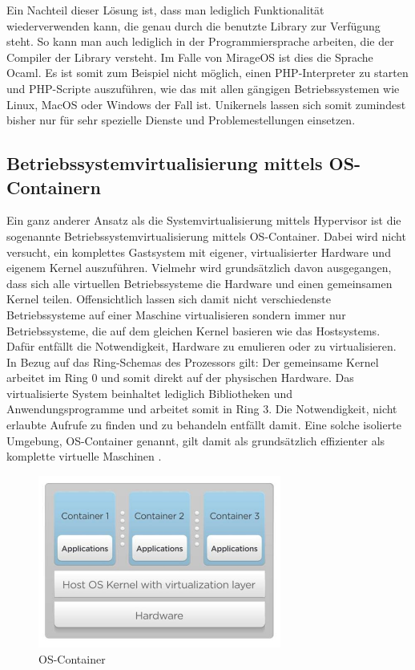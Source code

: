 Ein Nachteil dieser Lösung ist, dass man lediglich Funktionalität wiederverwenden kann, die genau durch die benutzte Library zur Verfügung steht. So kann man auch lediglich in der Programmiersprache arbeiten, die der Compiler der Library versteht. Im Falle von MirageOS ist dies die Sprache Ocaml. Es ist somit zum Beispiel nicht möglich, einen PHP-Interpreter zu starten und PHP-Scripte auszuführen, wie das mit allen gängigen Betriebssystemen wie Linux, MacOS oder Windows der Fall ist. Unikernels lassen sich somit zumindest bisher nur für sehr spezielle Dienste und Problemestellungen einsetzen.

\subsection{Betriebssystemvirtualisierung mittels OS-Containern}

Ein ganz anderer Ansatz als die Systemvirtualisierung mittels Hypervisor ist die sogenannte Betriebssystemvirtualisierung mittels OS-Container. Dabei wird nicht versucht, ein komplettes Gastsystem mit eigener, virtualisierter Hardware und eigenem Kernel auszuführen. Vielmehr wird grundsätzlich davon ausgegangen, dass sich alle virtuellen Betriebssysteme die Hardware und einen gemeinsamen Kernel teilen. Offensichtlich lassen sich damit nicht verschiedenste Betriebssysteme auf einer Maschine virtualisieren sondern immer nur Betriebssysteme, die auf dem gleichen Kernel basieren wie das Hostsystems. Dafür entfällt die Notwendigkeit, Hardware zu emulieren oder zu virtualisieren. In Bezug auf das Ring-Schemas des Prozessors gilt: Der gemeinsame Kernel arbeitet im Ring 0 und somit direkt auf der physischen Hardware. Das virtualisierte System beinhaltet lediglich Bibliotheken und Anwendungsprogramme und arbeitet somit in Ring 3. Die Notwendigkeit, nicht erlaubte Aufrufe zu finden und zu behandeln entfällt damit. Eine solche isolierte Umgebung, OS-Container genannt, gilt damit als grundsätzlich effizienter als komplette virtuelle Maschinen \citep[Vgl.][]{wiki:007}.

\begin{figure}[!ht]
  \begin{center}
    \includegraphics[width=8cm]{bilder/lxc-architecture.jpg}
    \caption{OS-Container \citep{Francis2014}}
  \end{center}
\end{figure}

